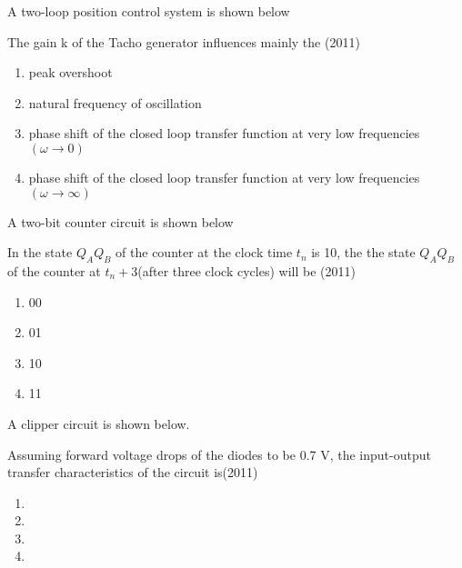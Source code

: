     \item A two-loop position control system is shown below
    
    The  gain k of the Tacho generator influences mainly the \hfill{(2011)}
    
            \begin{enumerate}
        \item peak overshoot
        \item natural frequency of oscillation
        \item phase shift of the closed loop transfer function at very low frequencies $(\omega \rightarrow 0)$
        \item phase shift of the closed loop transfer function at very low frequencies $(\omega \rightarrow \infty)$
        \end{enumerate}
      

    \item A two-bit counter circuit is shown below
    
    In the state $Q_A Q_B$ of the counter at the clock time $t_n$ is 10, the the state $Q_A Q_B$ of the counter at $t_n +3$(after three clock cycles)  will be \hfill{(2011)}
    
            \begin{enumerate}
             \item 00
\item 01
\item 10
\item 11 
              \end{enumerate}
        

    \item A clipper circuit is shown below.
    
    Assuming forward voltage drops of the diodes to be 0.7 V, the input-output transfer characteristics of the circuit is\hfill{(2011)}

 \begin{enumerate}
 \newpage
\item 
\newpage
\item 
\newpage
\item 

\item 
            \end{enumerate}
        

